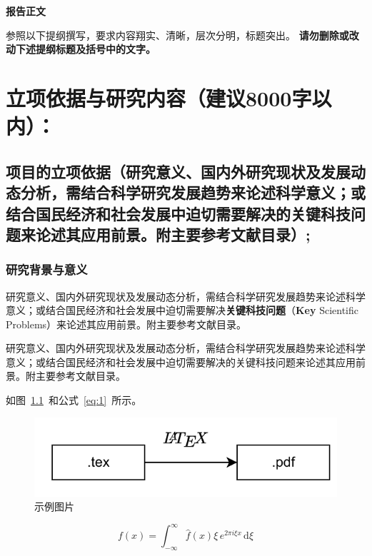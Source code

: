 \documentclass{nsfc}
\begin{document}

\begin{center}
    \Large\kaishu\textbf{报告正文}
\end{center}

\begin{onehalfspace}
    \large\kaishu
    参照以下提纲撰写，要求内容翔实、清晰，层次分明，标题突出。
    {\color{nsfc_blue}\textbf{请勿删除或改动下述提纲标题及括号中的文字。}}
\end{onehalfspace}

\chapter{立项依据与研究内容{\mdseries（建议8000字以内）：}}

\section{\textbf{项目的立项依据}（研究意义、国内外研究现状及发展动态分析，需结合科学研究发展趋势来论述科学意义；或结合国民经济和社会发展中迫切需要解决的关键科技问题来论述其应用前景。附主要参考文献目录）;}

\subsection{研究背景与意义}

研究意义、国内外研究现状及发展动态分析，需结合科学研究发展趋势来论述科学意义；或结合国民经济和社会发展中迫切需要解决\textbf{关键科技问题}（\textbf{Key} Scientific Problems）来论述其应用前景。附主要参考文献目录。

{\kaishu 研究意义、国内外研究现状及发展动态分析，需结合科学研究发展趋势来论述科学意义；或结合国民经济和社会发展中迫切需要解决的关键科技问题来论述其应用前景\cite{latex2e,latex:companion}。附主要参考文献目录。}

如图~\ref{fig:test}~和公式~\eqref{eq:1}~所示。

\begin{figure}[h]
    \centering
    \includegraphics[width=0.4\linewidth]{figure1.png}
    \caption{示例图片}
    \label{fig:test}
\end{figure}

\begin{equation}\label{eq:1}
    f(x) = \int_{-\infty}^\infty  \hat f(x)\xi\,e^{2 \pi i \xi x}  \,\mathrm{d}\xi 
\end{equation}
\end{document}
